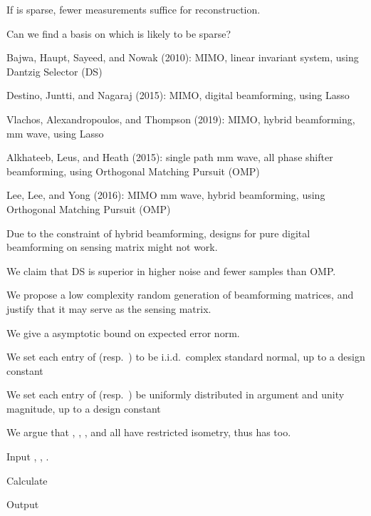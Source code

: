 {
\blank [big]

\I If  is sparse, fewer measurements suffice for reconstruction.

\I Can we find a basis on which  is likely to be sparse?
}
{
\I Bajwa, Haupt, Sayeed, and Nowak (2010): MIMO, linear invariant system, using Dantzig Selector (DS)

\I Destino, Juntti, and Nagaraj (2015): MIMO, digital beamforming, using Lasso

\I Vlachos, Alexandropoulos, and Thompson (2019): MIMO, hybrid beamforming, mm wave, using Lasso

\I Alkhateeb, Leus, and Heath (2015): single path mm wave, all phase shifter beamforming, using Orthogonal Matching Pursuit (OMP)

\I Lee, Lee, and Yong (2016): MIMO mm wave, hybrid beamforming, using Orthogonal Matching Pursuit (OMP)
}
{
\I Due to the constraint of hybrid beamforming, designs for pure digital beamforming on sensing matrix might not work.

\I We claim that DS is superior in higher noise and fewer samples than OMP.

\I We propose a low complexity random generation of beamforming matrices, and justify that it may serve as the sensing matrix.

\I We give a asymptotic bound on expected error norm.
}
{
\I We set each entry of  (resp.\ ) to be i.i.d.\ complex standard normal, up to a design constant

\I We set each entry of  (resp.\ ) be uniformly distributed in argument and unity magnitude, up to a design constant

\I We argue that , , , and  all have restricted isometry, thus  has too.
}
{
\I Input , , .

\I Calculate

\I Output 
}


